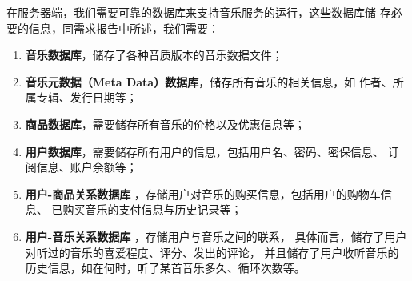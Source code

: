 在服务器端，我们需要可靠的数据库来支持音乐服务的运行，这些数据库储
存必要的信息，同需求报告中所述，我们需要：
    \begin{enumerate}
        \item \textbf{音乐数据库}，储存了各种音质版本的音乐数据文件；
        \item \textbf{音乐元数据（Meta Data）数据库}，储存所有音乐的相关信息，如
            作者、所属专辑、发行日期等；
        \item \textbf{商品数据库}，需要储存所有音乐的价格以及优惠信息等；
        \item \textbf{用户数据库}，需要储存所有用户的信息，包括用户名、密码、密保信息、
            订阅信息、账户余额等；
        \item \textbf{用户-商品关系数据库}
                    ，存储用户对音乐的购买信息，包括用户的购物车信息、
            已购买音乐的支付信息与历史记录等；
        \item \textbf{用户-音乐关系数据库}
                    ，存储用户与音乐之间的联系，
            具体而言，储存了用户对听过的音乐的喜爱程度、评分、发出的评论，
            并且储存了用户收听音乐的历史信息，如在何时，听了某首音乐多久、循环次数等。
    \end{enumerate}

